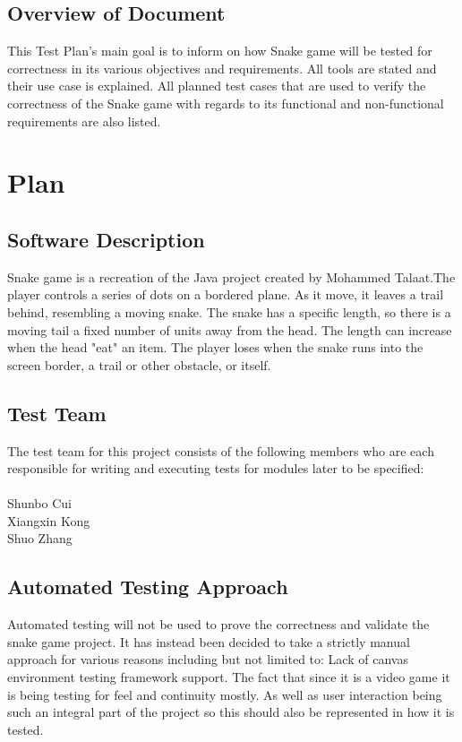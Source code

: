 \documentclass[12pt, titlepage]{article}
\begin{document}
\subsection{Overview of Document}
This Test Plan's main goal is to inform on how Snake game will be tested for correctness in its various objectives and requirements. All tools are stated and their use case is explained. All planned test cases that are used to verify the correctness of the Snake game with regards to its functional and non-functional requirements are also listed.


\section{Plan}                  %
	
\subsection{Software Description}
Snake game is a recreation of the Java project created by Mohammed Talaat.The player controls a series of dots on a bordered plane. As it move, it leaves a trail behind, resembling a moving snake. The snake has a specific length, so there is a moving tail a fixed number of units away from the head. The length can increase when the head "eat" an item. The player loses when the snake runs into the screen border, a trail or other obstacle, or itself.


\subsection{Test Team}
The test team for this project consists of the following members who are each responsible for writing and executing tests for modules later to be specified:\\
    \\Shunbo Cui
		\\Xiangxin Kong
		\\Shuo Zhang	


\subsection{Automated Testing Approach}
Automated testing will not be used to prove the correctness and validate the snake game project. It has instead been decided to take a strictly manual approach for various reasons including but not limited to: Lack of canvas environment testing framework support. The fact that since it is a video game it is being testing for feel and continuity mostly. As well as user interaction being such an integral part of the project so this should also be represented in how it is tested.
\end{document}

